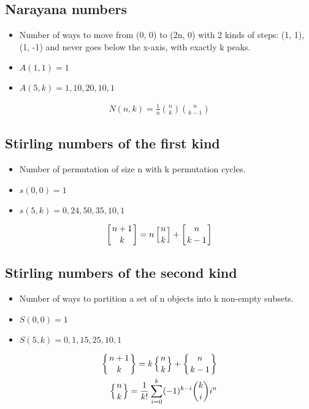 \documentclass{article}
\begin{document}
\subsection{Narayana numbers}
\begin{itemize}
    \item Number of ways to move from (0, 0) to (2n, 0) with 2 kinds of steps: (1, 1), (1, -1) and never goes below the x-axis, with exactly k peaks.
    \item $A(1, 1) = 1$
    \item $A(5, k) = 1, 10, 20, 10, 1$
\end{itemize}
\begin{align*}
    N(n,k) = \frac{1}{n} \binom{n}{k} \binom{n}{k-1}
\end{align*}

\subsection{Stirling numbers of the first kind}
\begin{itemize}
    \item Number of permutation of size n with k permutation cycles.
    \item $s(0, 0) = 1$
    \item $s(5, k) = 0, 24, 50, 35, 10, 1$
\end{itemize}
\begin{align*}
    \left[ {n+1 \atop k} \right] = n \left[ {n \atop k} \right] + \left[ {n \atop k-1} \right]
\end{align*}

\subsection{Stirling numbers of the second kind}
\begin{itemize}
    \item Number of ways to partition a set of n objects into k non-empty subsets.
    \item $S(0, 0) = 1$
    \item $S(5, k) = 0, 1, 15, 25, 10, 1$
\end{itemize}
\begin{align*}
\left\{ {n+1 \atop k} \right\} = k \left\{ {n \atop k} \right\} + \left\{ {n \atop k-1} \right\} \\
\left\{ {n \atop k} \right\} = \frac{1}{k!} \sum_{i=0}^{k} (-1)^{k-i} \binom{k}{i} i^n
\end{align*}
\end{document}
